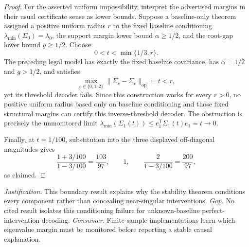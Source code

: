 \documentclass{article}
\begin{document}
\begin{proof}
For the asserted uniform impossibility, interpret the advertised margins in their usual certificate sense as lower bounds.  Suppose a baseline-only theorem assigned a positive uniform radius \(r\) to the fixed baseline conditioning \(\lambda_{\min}(\Sigma_0)=\lambda_0\), the support margin lower bound \(\alpha\ge1/2\), and the root-gap lower bound \(g\ge1/2\).  Choose
\[
 0<t<\min\{1/3,r\}.
\]
The preceding legal model has exactly the fixed baseline covariance, has \(\alpha=1/2\) and \(g>1/2\), and satisfies
\[
 \max_{c\in\{0,1,2\}}
 \|\widehat\Sigma_c-\Sigma_c\|_{\mathrm{op}}=t<r,
\]
yet its threshold decoder fails.  Since this construction works for every \(r>0\), no positive uniform radius based only on baseline conditioning and those fixed structural margins can certify this inverse-threshold decoder.  The obstruction is precisely the unmonitored limit \(\lambda_{\min}(\Sigma_1(t))\le e_1^{\mathsf T}\Sigma_1(t)e_1=t\to0\).

Finally, at \(t=1/100\), substitution into the three displayed off-diagonal magnitudes gives
\[
 \frac{1+3/100}{1-3/100}=\frac{103}{97},\qquad
 1,\qquad
 \frac{2}{1-3/100}=\frac{200}{97},
\]
as claimed.
\end{proof}
\par\smallskip\noindent \textit{Justification.} This boundary result explains why the stability theorem conditions every component rather than concealing near-singular interventions. \textit{Gap.} No cited result isolates this conditioning failure for unknown-baseline perfect-intervention decoding. \textit{Consumer.} Finite-sample implementations learn which eigenvalue margin must be monitored before reporting a stable causal explanation.
\end{document}
